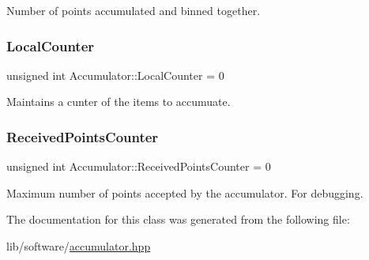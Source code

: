 Number of points accumulated and binned together. 

\mbox{\label{classAccumulator_a753e3878c3078a11ee9bc13b6185ec60}} 
\subsubsection{\texorpdfstring{Local\+Counter}{LocalCounter}}
{\footnotesize\ttfamily unsigned int Accumulator\+::\+Local\+Counter = 0\hspace{0.3cm}{\ttfamily [private]}}



Maintains a cunter of the items to accumuate. 

\mbox{\label{classAccumulator_a9cc7c392e99778c99593f7798cb2ab3b}} 
\subsubsection{\texorpdfstring{Received\+Points\+Counter}{ReceivedPointsCounter}}
{\footnotesize\ttfamily unsigned int Accumulator\+::\+Received\+Points\+Counter = 0\hspace{0.3cm}{\ttfamily [private]}}



Maximum number of points accepted by the accumulator. For debugging. 



The documentation for this class was generated from the following file\+:\begin{DoxyCompactItemize}
\item 
lib/software/\hyperlink{accumulator_8hpp}{accumulator.\+hpp}\end{DoxyCompactItemize}
